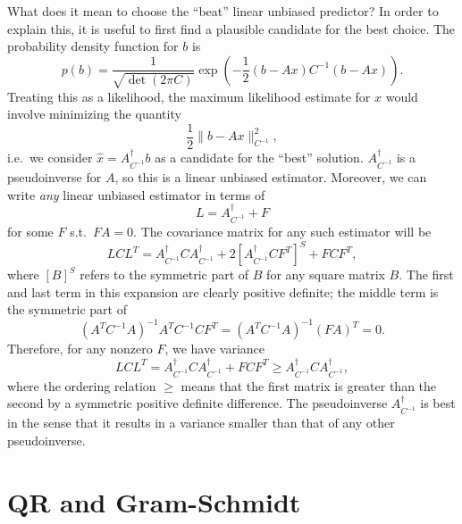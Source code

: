 \documentclass[12pt, leqno]{article} %
\begin{document}
What does it mean to choose the ``beat'' linear unbiased predictor?
In order to explain this, it is useful to first find a plausible
candidate for the best choice.  The probability density function for $b$ is
\[
  p(b) = \frac{1}{\sqrt{\det(2\pi C)}} \exp\left( -\frac{1}{2}(b-Ax) C^{-1} (b-Ax) \right).
\]
Treating this as a likelihood, the maximum likelihood estimate for $x$
would involve minimizing the quantity
\[
  \frac{1}{2} \|b-Ax\|_{C^{-1}}^2,
\]
i.e.~we consider $\hat{x} = A^\dagger_{C^{-1}} b$ as a candidate for
the ``best'' solution.  $A^\dagger_{C^{-1}}$ is a pseudoinverse for
$A$, so this is a linear unbiased estimator.  Moreover, we can write
{\em any} linear unbiased estimator in terms of
\[
  L = A^{\dagger}_{C^{-1}} + F
\]
for some $F$ s.t.~$FA = 0$.  The covariance matrix for any such
estimator will be
\[
  L C L^T =
  A^{\dagger}_{C^{-1}} C A^{\dagger}_{C^{-1}} +
  2 [A^{\dagger}_{C^{-1}} C F^T]^S +
  F C F^T,
\]
where $[B]^S$ refers to the symmetric part of $B$ for any square
matrix $B$.  The first and last term in this expansion are clearly
positive definite; the middle term is the symmetric part of
\[
  (A^T C^{-1} A)^{-1} A^T C^{-1} C F^T = 
  (A^T C^{-1} A)^{-1} (FA)^T = 0.
\]
Therefore, for any nonzero $F$, we have variance
\[
  L C L^T =
  A^{\dagger}_{C^{-1}} C A^{\dagger}_{C^{-1}} + F C F^T \geq
  A^{\dagger}_{C^{-1}} C A^{\dagger}_{C^{-1}},
\]
where the ordering relation $\geq$ means that the first matrix is
greater than the second by a symmetric positive definite difference.
The pseudoinverse $A^\dagger_{C^{-1}}$ is best in the sense that it
results in a variance smaller than that of any other pseudoinverse.

\section{QR and Gram-Schmidt}
\end{document}
